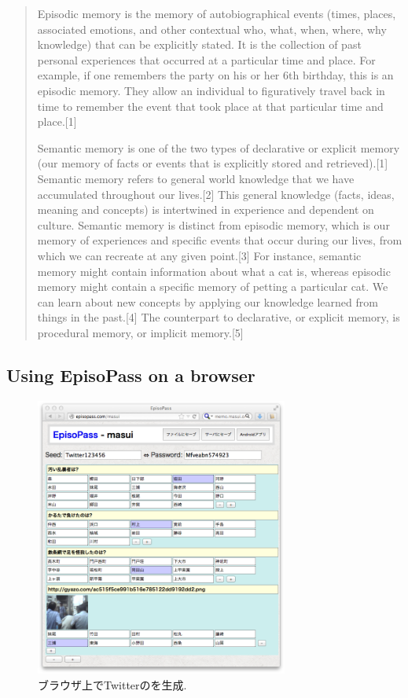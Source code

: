 \documentclass{article}
\begin{document}
\begin{quote}
Episodic memory is the memory of autobiographical events (times,
places, associated emotions, and other contextual who, what, when,
where, why knowledge) that can be explicitly stated. It is the
collection of past personal experiences that occurred at a particular
time and place. For example, if one remembers the party on his or her
6th birthday, this is an episodic memory. They allow an individual to
figuratively travel back in time to remember the event that took place
at that particular time and place.[1]

Semantic memory is one of the two types of declarative or explicit
memory (our memory of facts or events that is explicitly stored and
retrieved).[1] Semantic memory refers to general world knowledge that
we have accumulated throughout our lives.[2] This general knowledge
(facts, ideas, meaning and concepts) is intertwined in experience and
dependent on culture. Semantic memory is distinct from episodic
memory, which is our memory of experiences and specific events that
occur during our lives, from which we can recreate at any given
point.[3] For instance, semantic memory might contain information
about what a cat is, whereas episodic memory might contain a specific
memory of petting a particular cat. We can learn about new concepts by
applying our knowledge learned from things in the past.[4] The
counterpart to declarative, or explicit memory, is procedural memory,
or implicit memory.[5]
\end{quote}

\subsection{Using EpisoPass on a browser}

\begin{figure}[H]
\centerline{\includegraphics[width=83mm,bb=0 0 718 796]{../WISS/figures/785ff09b4233804d2ec89c3af71ee5d0.png}}
\caption{ブラウザ上でTwitterの{\PW}を生成.}
\label{web1}
\end{figure}
\end{document}
